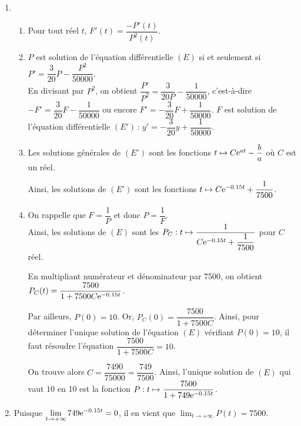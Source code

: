 \documentclass[11pt,fleqn, openany]{book} %
\begin{document}
\begin{solution} \hspace{0pt}
\begin{enumerate}\item \begin{enumerate}\item Pour tout réel \(t\), \(F'(t)=\dfrac{-P'(t)}{P^2(t)}\).
	\item \(P\) est solution de l'équation différentielle \((E)\) si et seulement si  \(P' = \dfrac{3}{20}P - \dfrac{P^2}{50000}\). \\ En divisant par \(P^2\), on obtient \( \dfrac{P'}{P^2} = \dfrac{3}{20P} - \dfrac{1}{50000}\), c'est-à-dire \(-F'=\dfrac{3}{20}F-\dfrac{1}{50000}\) ou encore \(F'=-\dfrac{3}{20}F+\dfrac{1}{50000}\). \(F\) est solution de l'équation différentielle \((E') \, : \, y'=-\dfrac{3}{20}y + \dfrac{1}{50000}\).
	\vskip5pt
	\item  Les solutions générales de $(E')$ sont  les fonctions \(t\mapsto C \mathrm{e}^{at}-\dfrac{b}{a}\) où \(C\) est un réel. 
	
	Ainsi, les solutions de \((E')\) sont les fonctions \(t \mapsto C\mathrm{e}^{-0.15t}+\dfrac{1}{7500}\).
	\item On rappelle que \(F=\dfrac{1}{P}\) et donc \(P=\dfrac{1}{F}\). \\ Ainsi, les solutions de \((E)\) sont les \(P_C:t \mapsto \dfrac{1}{C\mathrm{e}^{-0.15t}+\dfrac{1}{7500}}\) pour \(C\) réel. 
	
	En multipliant numérateur et dénominateur par 7500, on obtient \(P_C(t)=\dfrac{7500}{1+7500C\mathrm{e}^{-0.15t}}\). 
	
	Par ailleurs, \(P(0)=10\). Or, \(P_C(0)=\dfrac{7500}{1+7500C}\). Ainsi, pour déterminer l'unique solution de l'équation \((E)\) vérifiant \(P(0)=10\), il faut résoudre l'équation \(\dfrac{7500}{1+7500C}=10\).
	
	 On trouve alors \(C=\dfrac{7490}{75000}=\dfrac{749}{7500}\). Ainsi, l'unique solution de \((E)\) qui vaut \(10\) en 10 est la fonction \(P:t \mapsto \dfrac{7500}{1+749\mathrm{e}^{-0.15t}}\).\end{enumerate}
	\item Puisque \(\displaystyle \lim_{t \to + \infty} 749\mathrm{e}^{-0.15t} = 0\), il en vient que \(\displaystyle \lim_{t \to + \infty} P(t)=7500\).
\end{enumerate}\end{solution}
\end{document}
